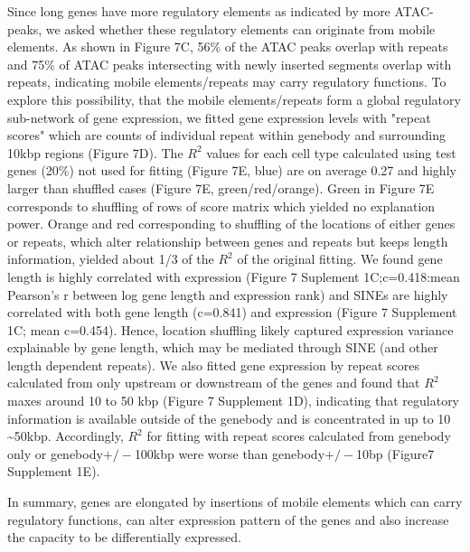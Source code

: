 Since long genes have more regulatory elements as indicated by more ATAC-peaks, we asked whether these regulatory elements can originate from mobile elements. As shown in Figure 7C, 56\% of the ATAC peaks overlap with repeats and 75\% of ATAC peaks intersecting with newly inserted segments overlap with repeats, indicating mobile elements/repeats may carry regulatory functions. To explore this possibility, that the mobile elements/repeats form a global regulatory sub-network of gene expression, we fitted gene expression levels with "repeat scores" which are counts of individual repeat within genebody and surrounding 10kbp regions (Figure 7D).  The $R^2$ values for each cell type calculated using test genes (20\%) not used for fitting (Figure 7E, blue) are on average 0.27 and highly larger than shuffled cases (Figure 7E, green/red/orange). Green in Figure 7E corresponds to shuffling of rows of score matrix which yielded no explanation power. Orange and red corresponding to shuffling of the locations of either genes or repeats, which alter relationship between genes and repeats but keeps length information, yielded about 1/3 of the $R^2$ of the original fitting. We found gene length is highly correlated with expression (Figure 7 Suplement 1C;c=0.418:mean Pearson's r between log gene length and expression rank) and SINEs are highly correlated with both gene length (c=0.841) and expression (Figure 7 Supplement 1C; mean c=0.454). Hence, location shuffling likely captured expression variance explainable by gene length, which may be mediated through SINE (and other length dependent repeats). We also fitted gene expression by repeat scores calculated from only upstream or downstream of the genes and found that $R^2$ maxes around 10 to 50 kbp (Figure 7 Supplement 1D), indicating that regulatory information is available outside of the genebody and is concentrated in up to 10 \sim 50kbp. Accordingly, $R^2$ for fitting with repeat scores calculated from genebody only or genebody$+/-$100kbp were worse than genebody$+/-$10bp (Figure7 Supplement 1E). 

In summary, genes are elongated by insertions of mobile elements which can carry regulatory functions, can alter expression pattern of the genes and also increase the capacity to be differentially expressed. 


